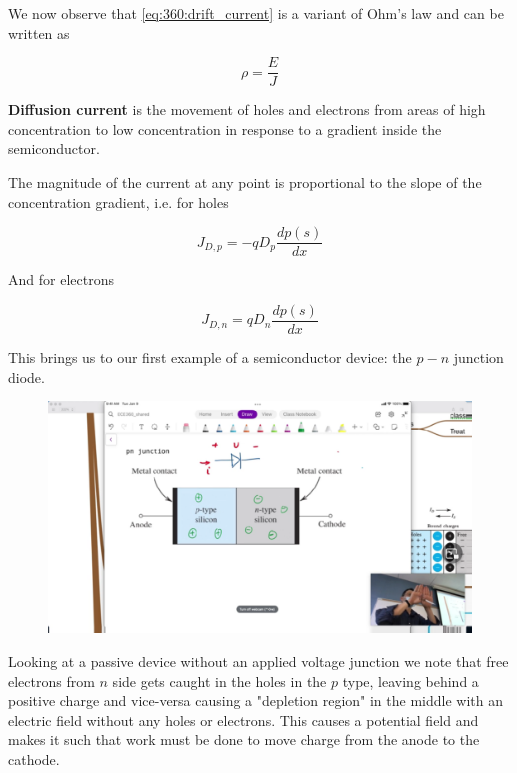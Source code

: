 \documentclass[../notes.tex]{subfiles}
\begin{document}
We now observe that \eqref{eq:360:drift_current} is a variant of Ohm's law and can be written as

\begin{equation}
	\rho = \frac{E}{J}
\end{equation}

\textbf{Diffusion current} is the movement of holes and electrons from areas of high concentration to low concentration in response to a gradient inside the semiconductor.

The magnitude of the current at any point is proportional to the slope of the concentration gradient, i.e. for holes


\begin{equation}
	J_{D,p}  = -qD_p \frac{dp(s)}{dx}
\end{equation}

And for electrons


\begin{equation}
	J_{D,n}  = qD_n \frac{dp(s)}{dx}
\end{equation}



This brings us to our first example of a semiconductor device: the $ p-n $ junction diode.


\begin{figure}[H]
	\centering
	\includegraphics[width=0.8\linewidth]{img/image_2022-10-19-19-47-03.png}
\end{figure}

Looking at a passive device without an applied voltage junction we note that free electrons from $ n $ side gets caught in the holes in the $ p $ type, leaving behind a positive charge and vice-versa causing a "depletion region" in the middle with an electric field without any holes or electrons.
This causes a potential field and makes it such that work must be done to move charge from the anode to the cathode.
\end{document}
